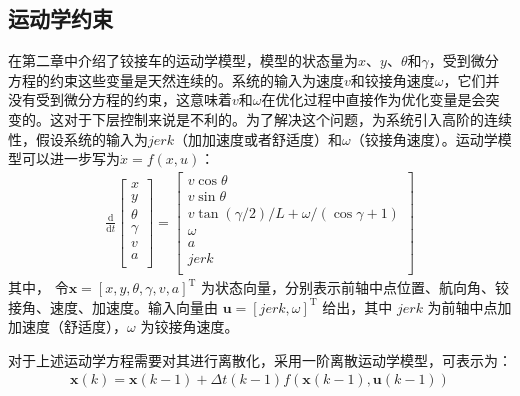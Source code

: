 \documentclass[master,academic]{ysuthesis} %
\begin{document}
		\subsection{运动学约束}
		在第二章中介绍了铰接车的运动学模型，模型的状态量为$x$、$y$、$\theta$和$\gamma$，受到微分方程的约束这些变量是天然连续的。系统的输入为速度$v$和铰接角速度$\omega$，它们并没有受到微分方程的约束，这意味着$v$和$\omega$在优化过程中直接作为优化变量是会突变的。这对于下层控制来说是不利的。为了解决这个问题，为系统引入高阶的连续性，假设系统的输入为$jerk$（加加速度或者舒适度）和$\omega$（铰接角速度）。运动学模型可以进一步写为$\dot{x}=f( x,u )$：
		\begin{equation}
			\begin{aligned}
				 \frac{\mathrm{d}}{\mathrm{d}t}\left[ \begin{array}{c}
					x\\
					y\\
					\theta\\
					\gamma\\
					v\\
					a\\
				\end{array} \right] =\left[ \begin{array}{c}
					v\cos\theta\\
					v\sin\theta\\
					v\tan( \gamma /2 ) /L+\omega / (\cos\gamma +1 )\\
					\omega\\
					a\\
					jerk\\
				\end{array} \right] 
			\end{aligned}   
		\end{equation}
		其中， 令$\bm{x}=\left[ x,y,\theta,\gamma,v,a \right]^{\mathrm{T}}$ 为状态向量，分别表示前轴中点位置、航向角、铰接角、速度、加速度。输入向量由 $\bm{u}=\left[jerk,\omega\right]^{\mathrm{T}}$ 给出，其中 $jerk$ 为前轴中点加加速度（舒适度），$\omega$ 为铰接角速度。

		对于上述运动学方程需要对其进行离散化，采用一阶离散运动学模型，可表示为：
		\begin{equation}
			\begin{aligned}
				\bm{x}( k ) =\bm{x}( k-1 ) +\Delta t( k-1 ) f( \bm{x}( k-1 ) ,\bm{u}( k-1 ) ) 
			\end{aligned}   
		\end{equation}
\end{document}
